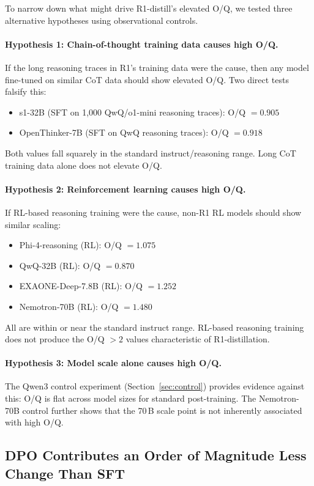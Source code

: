 \documentclass[11pt]{article}
\begin{document}
To narrow down what might drive R1-distill's elevated O/Q, we tested three
alternative hypotheses using observational controls.

\paragraph{Hypothesis 1: Chain-of-thought training data causes high O/Q.}
If the long reasoning traces in R1's training data were the cause, then any
model fine-tuned on similar CoT data should show elevated O/Q.
Two direct tests falsify this:
\begin{itemize}[nosep]
  \item s1-32B (SFT on 1,000 QwQ/o1-mini reasoning traces): O/Q $= 0.905$
  \item OpenThinker-7B (SFT on QwQ reasoning traces): O/Q $= 0.918$
\end{itemize}
Both values fall squarely in the standard instruct/reasoning range.
Long CoT training data alone does not elevate O/Q.

\paragraph{Hypothesis 2: Reinforcement learning causes high O/Q.}
If RL-based reasoning training were the cause, non-R1 RL models should show
similar scaling:
\begin{itemize}[nosep]
  \item Phi-4-reasoning (RL): O/Q $= 1.075$
  \item QwQ-32B (RL): O/Q $= 0.870$
  \item EXAONE-Deep-7.8B (RL): O/Q $= 1.252$
  \item Nemotron-70B (RL): O/Q $= 1.480$
\end{itemize}
All are within or near the standard instruct range.
RL-based reasoning training does not produce the O/Q $> 2$ values characteristic
of R1-distillation.

\paragraph{Hypothesis 3: Model scale alone causes high O/Q.}
The Qwen3 control experiment (Section~\ref{sec:control}) provides evidence
against this: O/Q is flat across model sizes for standard post-training.
The Nemotron-70B control further shows that the 70\,B scale point is not
inherently associated with high O/Q.


\subsection{DPO Contributes an Order of Magnitude Less Change Than SFT}
\label{sec:dpo}
\end{document}
